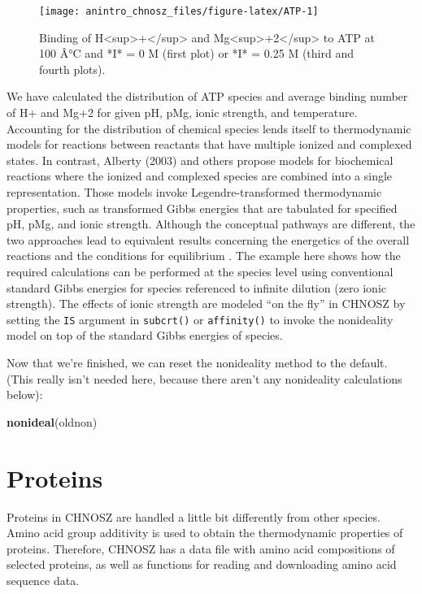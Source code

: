 \documentclass[]{tufte-handout}
\newenvironment{Shaded}{}{}
\newcommand{\KeywordTok}[1]{\textcolor[rgb]{0.00,0.44,0.13}{\textbf{#1}}}
\newcommand{\NormalTok}[1]{#1}
\begin{document}
\begin{figure}
\texttt{[image: anintro\_chnosz\_files/figure-latex/ATP-1]} \caption[Binding of H<sup>+</sup> and Mg<sup>+2</sup> to ATP at 100 Â°C and *I* = 0 M (first plot) or *I* = 0.25 M (third and fourth plots)]{Binding of H<sup>+</sup> and Mg<sup>+2</sup> to ATP at 100 Â°C and *I* = 0 M (first plot) or *I* = 0.25 M (third and fourth plots).}\label{fig:ATP}
\end{figure}

We have calculated the distribution of ATP species and average binding
number of H+ and Mg+2 for given pH, pMg, ionic strength, and
temperature. Accounting for the distribution of chemical species lends
itself to thermodynamic models for reactions between reactants that have
multiple ionized and complexed states. In contrast, Alberty (2003) and
others propose models for biochemical reactions where the ionized and
complexed species are combined into a single representation. Those
models invoke Legendre-transformed thermodynamic properties, such as
transformed Gibbs energies that are tabulated for specified pH, pMg, and
ionic strength. Although the conceptual pathways are different, the two
approaches lead to equivalent results concerning the energetics of the
overall reactions and the conditions for equilibrium \citep{SVI12}. The
example here shows how the required calculations can be performed at the
species level using conventional standard Gibbs energies for species
referenced to infinite dilution (zero ionic strength). The effects of
ionic strength are modeled ``on the fly'' in CHNOSZ by setting the
\texttt{IS} argument in {\texttt{subcrt()}} or {\texttt{affinity()}} to
invoke the nonideality model on top of the standard Gibbs energies of
species.

Now that we're finished, we can reset the nonideality method to the
default. (This really isn't needed here, because there aren't any
nonideality calculations below):

\begin{Shaded}
\begin{Highlighting}[]
\KeywordTok{nonideal}\NormalTok{(oldnon)}
\end{Highlighting}
\end{Shaded}

\section{Proteins}\label{proteins}

Proteins in CHNOSZ are handled a little bit differently from other
species. Amino acid group additivity is used to obtain the thermodynamic
properties of proteins. Therefore, CHNOSZ has a data file with amino
acid compositions of selected proteins, as well as functions for reading
and downloading amino acid sequence data.
\end{document}

